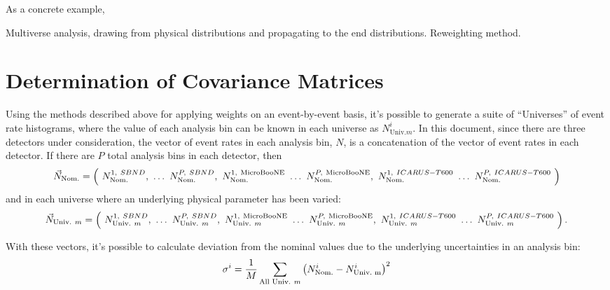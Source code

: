 As a concrete example, 



Multiverse analysis, drawing from physical distributions and propagating to the end distributions.  Reweighting method.

\section{Determination of Covariance Matrices}
\label{sec:covariance_matrix}

Using the methods described above for applying weights on an event-by-event basis, it's possible to generate a suite of ``Universes''
of event rate histograms, where the value of each analysis bin can be known in each universe as $N^i_{\text{Univ.} m}.$  In this document, since there are three detectors under consideration, the vector of event rates in each analysis bin, $N$, is a concatenation of the vector of event rates in each detector.  If there are $P$ total analysis bins in each detector, then 
\begin{equation}
\begin{centering}
\vec{N}_{\text{Nom.}} = \left(~N_{\text{Nom.}}^{1,~SBND},~\dots~N_{\text{Nom.}}^{P,~SBND},~N_{\text{Nom.}}^{1,~\uboone}~\dots~N_{\text{Nom.}}^{P,~\uboone},~N_{\text{Nom.}}^{1,~\icarus}~\dots~N_{\text{Nom.}}^{P,~\icarus} ~\right)
\end{centering}
\end{equation}
and in each universe where an underlying physical parameter has been varied:
\begin{equation}
\begin{centering}
\vec{N}_{\text{Univ.}~m} = \left(~N_{\text{Univ.}~m}^{1,~SBND},~\dots~N_{\text{Univ.}~m}^{P,~SBND},~N_{\text{Univ.}~m}^{1,~\uboone}~\dots~N_{\text{Univ.}~m}^{P,~\uboone},~N_{\text{Univ.}~m}^{1,~\icarus}~\dots~N_{\text{Univ.}~m}^{P,~\icarus} ~\right).
\end{centering}
\end{equation}

With these vectors, it's possible to calculate deviation from the nominal values due to the underlying uncertainties in an analysis bin:
\begin{equation*}
\begin{centering}
\sigma^i = \frac{1}{M}\sum_{\text{All Univ.}~m} \left( N^i_{\text{Nom.}} - N^i_{\text{Univ.~m}}\right)^2
\end{centering}
\end{equation*}

